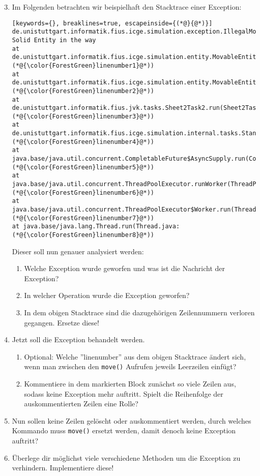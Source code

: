 \begin{enumerate}[label=\alph*)] \setcounter{enumi}{2}
    \item Im Folgenden betrachten wir beispielhaft den Stacktrace einer Exception:
    \begin{lstlisting}[keywords={}, breaklines=true, escapeinside={(*@}{@*)}]
de.unistuttgart.informatik.fius.icge.simulation.exception.IllegalMoveException: Solid Entity in the way
at de.unistuttgart.informatik.fius.icge.simulation.entity.MovableEntity.internalMove(MovableEntity.java:(*@{\color{ForestGreen}linenumber1}@*))
at de.unistuttgart.informatik.fius.icge.simulation.entity.MovableEntity.move(MovableEntity.java:(*@{\color{ForestGreen}linenumber2}@*))
at de.unistuttgart.informatik.fius.jvk.tasks.Sheet2Task2.run(Sheet2Task2.java:(*@{\color{ForestGreen}linenumber3}@*))
at de.unistuttgart.informatik.fius.icge.simulation.internal.tasks.StandardTaskRunner.executeTask(StandardTaskRunner.java:(*@{\color{ForestGreen}linenumber4}@*))
at java.base/java.util.concurrent.CompletableFuture$AsyncSupply.run(CompletableFuture.java:(*@{\color{ForestGreen}linenumber5}@*))
at java.base/java.util.concurrent.ThreadPoolExecutor.runWorker(ThreadPoolExecutor.java:(*@{\color{ForestGreen}linenumber6}@*))
at java.base/java.util.concurrent.ThreadPoolExecutor$Worker.run(ThreadPoolExecutor.java:(*@{\color{ForestGreen}linenumber7}@*))
at java.base/java.lang.Thread.run(Thread.java:(*@{\color{ForestGreen}linenumber8}@*))
    \end{lstlisting}
    Dieser soll nun genauer analysiert werden:
    \begin{enumerate}
        \item[i)] Welche Exception wurde geworfen und was ist die Nachricht der Exception?
        \item[ii)] In welcher Operation wurde die Exception geworfen?
        \item[iii)] In dem obigen Stacktrace sind die dazugehörigen Zeilennummern verloren gegangen. Ersetze diese!  
    \end{enumerate}
    \item Jetzt soll die Exception behandelt werden.
    \begin{enumerate}
        \item[i)] Optional: Welche ''linenumber'' aus dem obigen Stacktrace ändert sich, wenn man zwischen den \lstinline{move()} Aufrufen jeweils
        Leerzeilen einfügt?  
        \item[ii)] Kommentiere in dem markierten Block zunächst so viele Zeilen aus, sodass keine Exception mehr auftritt. 
        Spielt die Reihenfolge der auskommentierten Zeilen eine Rolle?
    \end{enumerate}
    \item  Nun sollen keine Zeilen gelöscht oder auskommentiert werden, durch welches Kommando muss \lstinline{move()} ersetzt werden, damit 
    denoch keine Exception auftritt?
    \item Überlege dir möglichst viele verschiedene Methoden um die Exception zu verhindern. Implementiere diese!
\end{enumerate}
 
